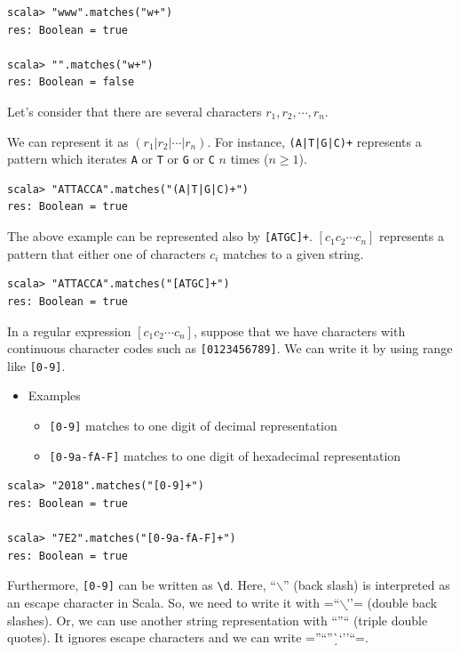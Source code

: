\documentclass[11pt]{article}
\begin{document}
\begin{verbatim}
scala> "www".matches("w+")
res: Boolean = true

scala> "".matches("w+")
res: Boolean = false
\end{verbatim}

Let's consider that there are several characters \(r_1, r_2, \cdots, r_n\).

We can represent it as \((r_1|r_2|\cdots|r_n)\). 
For instance, \texttt{(A|T|G|C)+} represents a pattern which iterates \texttt{A} or
\texttt{T} or \texttt{G} or \texttt{C} \(n\) times (\(n \ge 1\)).

\begin{verbatim}
scala> "ATTACCA".matches("(A|T|G|C)+")
res: Boolean = true
\end{verbatim}

The above example can be represented also by \texttt{[ATGC]+}. 
\([c_1c_2\cdots c_n]\) represents a pattern that either one of
characters \(c_i\) matches to a given string. 
\begin{verbatim}
scala> "ATTACCA".matches("[ATGC]+")
res: Boolean = true
\end{verbatim}

In a regular expression \([c_1c_2\cdots c_n]\), 
suppose that we have characters with continuous character codes 
such as \texttt{[0123456789]}. 
We can write it by using range like \texttt{[0-9]}. 

\begin{itemize}
\item Examples
\begin{itemize}
\item \texttt{[0-9]} matches to one digit of decimal representation
\item \texttt{[0-9a-fA-F]} matches to one digit of hexadecimal representation
\end{itemize}
\end{itemize}

\begin{verbatim}
scala> "2018".matches("[0-9]+")
res: Boolean = true

scala> "7E2".matches("[0-9a-fA-F]+")
res: Boolean = true
\end{verbatim}

Furthermore, \texttt{[0-9]} can be written as \texttt{\textbackslash{}d}. 
Here, ``$\backslash$'' (back slash) is interpreted as an escape character in
Scala. 
So, we need to write it with =``$\backslash$\d''= (double back slashes). 
Or, we can use another string representation with ``''`` (triple double
quotes). It ignores escape characters and we can write =''``''\d``''``=. 
\end{document}
